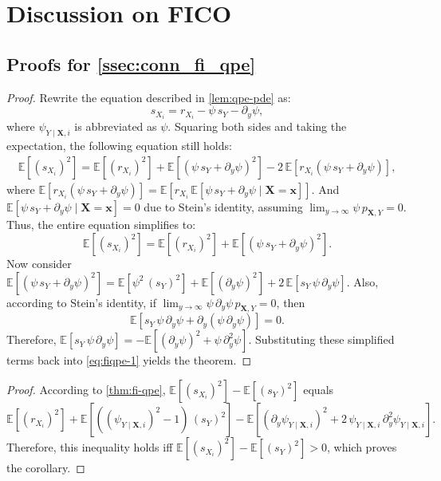 \documentclass{article}
\theoremstyle{plain}
\theoremstyle{definition}
\theoremstyle{remark}
\begin{document}
\section{Discussion on FICO}

\subsection{Proofs for \cref{ssec:conn_fi_qpe}}
\label{app:b_proofs}

\fiqpe*
\begin{proof}
Rewrite the equation described in \cref{lem:qpe-pde} as:
\[s_{X_i}=r_{X_i}-\psi\,s_{Y}-\partial_y\psi,\]
where $\psi_{Y\mid\bm{X},i}$ is abbreviated as $\psi$. Squaring both sides and taking the expectation, the following equation still holds:
\begin{align}
\label{eq:fiqpe-1}
\mathbb{E}\left[(s_{X_i})^2\right]=\mathbb{E}\left[(r_{X_i})^2\right]+\mathbb{E}\left[(\psi\,s_{Y}+\partial_y\psi)^2\right]-2\,\mathbb{E}\left[r_{X_i}(\psi\,s_{Y}+\partial_y\psi)\right],
\end{align}
where $\mathbb{E}\left[r_{X_i}(\psi\,s_{Y}+\partial_y\psi)\right]=\mathbb{E}\left[r_{X_i}\,\mathbb{E}\left[\psi\,s_{Y}+\partial_y\psi\mid\bm{X}=\bm{x}\right]\right]$. And $\mathbb{E}\left[\psi\,s_{Y}+\partial_y\psi\mid\bm{X}=\bm{x}\right]=0$ due to Stein's identity, assuming $\lim_{y\to\infty}\psi\,p_{\bm{X},Y}=0$. Thus, the entire equation simplifies to:
\[\mathbb{E}\left[(s_{X_i})^2\right]=\mathbb{E}\left[(r_{X_i})^2\right]+\mathbb{E}\left[(\psi\,s_{Y}+\partial_y\psi)^2\right].\]
Now consider $\mathbb{E}\left[(\psi\,s_{Y}+\partial_y\psi)^2\right]=\mathbb{E}\left[\psi^2\,(s_{Y})^2\right]+\mathbb{E}\left[(\partial_y\psi)^2\right]+2\,\mathbb{E}\left[s_{Y}\,\psi\,\partial_y\psi\right]$. Also, according to Stein's identity, if $\lim_{y\to\infty}\psi\,\partial_y\psi\,p_{\bm{X},Y}=0$, then
\[\mathbb{E}\left[s_{Y}\,\psi\,\partial_y\psi+\partial_y(\psi\,\partial_y\psi)\right]=0.\]
Therefore, $\mathbb{E}\left[s_{Y}\,\psi\,\partial_y\psi\right]=-\mathbb{E}\left[(\partial_y\psi)^2+\psi\,\partial^2_y\psi\right]$. Substituting these simplified terms back into \cref{eq:fiqpe-1} yields the theorem.
\end{proof}

\fiineq*
\begin{proof}
According to \cref{thm:fi-qpe}, $\mathbb{E}\left[(s_{X_i})^2\right]-\mathbb{E}\left[(s_{Y})^2\right]$ equals
\[\mathbb{E}\left[(r_{X_i})^2\right]+\mathbb{E}\left[((\psi_{Y\mid\bm{X},i})^2-1)\,(s_Y)^2\right]-\mathbb{E}\left[(\partial_{y}\psi_{Y\mid\bm{X},i})^2+2\,\psi_{Y\mid\bm{X},i}\,\partial^2_{y}\psi_{Y\mid\bm{X},i}\right].\]
Therefore, this inequality holds iff $\mathbb{E}\left[(s_{X_i})^2\right]-\mathbb{E}\left[(s_{Y})^2\right]>0$, which proves the corollary.
\end{proof}%
\end{document}
